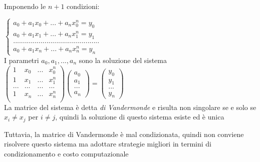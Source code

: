\documentclass[openany]{book}
\begin{document}
Imponendo le $n+1$ condizioni:

$\left\{ \begin{array}{l} a_0 + a_1x_0+...+a_nx_0^n=y_0 \\
a_0 + a_1x_1+...+a_nx_1^n=y_1 \\ 
............................................\\
a_0 + a_1x_n+...+a_nx_n^n=y_n \end{array}\right.$
\\

I parametri $a_0,a_1,...,a_n$ sono la soluzione del sistema 
\\

$\left( \begin{array}{llll} 1 & x_0 & ... & x_0^n \\
1 & x_1 & ... & x_1^n \\
... & ... & ... & ... \\
1 & x_n & ... & x_n^n \\ \end{array}\right)
\left( \begin{array}{l} a_0 \\ a_1 \\ ... \\ a_n \end{array}\right) =
\left( \begin{array}{l} y_0 \\ y_1 \\ ... \\ y_n \end{array}\right)
$
\\

La matrice del sistema è detta \textit{di Vandermonde} e risulta non singolare se e solo se $x_i\neq x_j$ 
per $i\neq j$, quindi la soluzione di questo sistema esiste ed è unica

Tuttavia, la matrice di Vandermonde è mal condizionata, quindi non conviene risolvere questo sistema ma adottare strategie migliori in termini di condizionamento e costo computazionale 
\end{document}
